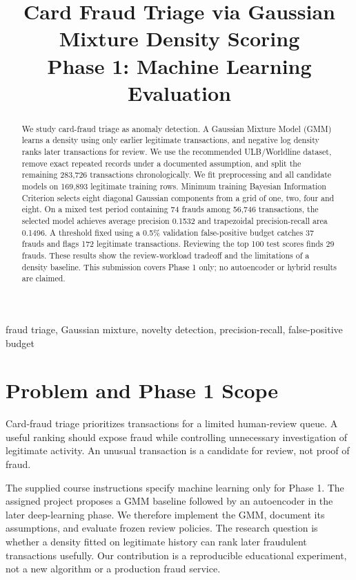 \documentclass[conference]{IEEEtran}
\title{Card Fraud Triage via Gaussian Mixture Density Scoring\\Phase 1: Machine Learning Evaluation}
\author{\IEEEauthorblockN{H Maheshwari, Vaibhav, Mayank, Keshav, Mitul Bhatia}
\IEEEauthorblockA{Team T011, Section A, Project 26\\Newton School of Technology, Rishihood University\\
Enrollment: 2401010174, 2401010486, 2401010267, 2401010222, 2401010279}}
\begin{document}
\maketitle
\begin{abstract}
We study card-fraud triage as anomaly detection. A Gaussian Mixture Model (GMM) learns a density using only earlier legitimate transactions, and negative log density ranks later transactions for review. We use the recommended ULB/Worldline dataset, remove exact repeated records under a documented assumption, and split the remaining 283,726 transactions chronologically. We fit preprocessing and all candidate models on 169,893 legitimate training rows. Minimum training Bayesian Information Criterion selects eight diagonal Gaussian components from a grid of one, two, four and eight. On a mixed test period containing 74 frauds among 56,746 transactions, the selected model achieves average precision 0.1532 and trapezoidal precision-recall area 0.1496. A threshold fixed using a 0.5\% validation false-positive budget catches 37 frauds and flags 172 legitimate transactions. Reviewing the top 100 test scores finds 29 frauds. These results show the review-workload tradeoff and the limitations of a density baseline. This submission covers Phase 1 only; no autoencoder or hybrid results are claimed.
\end{abstract}
\begin{IEEEkeywords}
fraud triage, Gaussian mixture, novelty detection, precision-recall, false-positive budget
\end{IEEEkeywords}

\section{Problem and Phase 1 Scope}
Card-fraud triage prioritizes transactions for a limited human-review queue. A useful ranking should expose fraud while controlling unnecessary investigation of legitimate activity. An unusual transaction is a candidate for review, not proof of fraud.

The supplied course instructions specify machine learning only for Phase 1. The assigned project proposes a GMM baseline followed by an autoencoder in the later deep-learning phase. We therefore implement the GMM, document its assumptions, and evaluate frozen review policies. The research question is whether a density fitted on legitimate history can rank later fraudulent transactions usefully. Our contribution is a reproducible educational experiment, not a new algorithm or a production fraud service.
\end{document}
